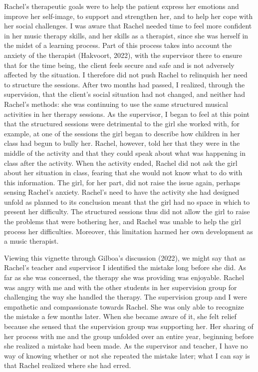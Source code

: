\documentclass[authordate, empirical, issue]{jote-new-article}
\begin{document}
Rachel's therapeutic goals were to help the patient express her emotions and improve her self-image, to support and strengthen her, and to help her cope with her social challenges. I was aware that Rachel needed time to feel more confident in her music therapy skills, and her skills as a therapist, since she was herself in the midst of a learning process. Part of this process takes into account the anxiety of the therapist (Hakvoort, 2022), with the supervisor there to ensure that for the time being, the client feels secure and safe and is not adversely affected by the situation. I therefore did not push Rachel to relinquish her need to structure the sessions. After two months had passed, I realized, through the supervision, that the client's social situation had not changed, and neither had Rachel's methods: she was continuing to use the same structured musical activities in her therapy sessions. As the supervisor, I began to feel at this point that the structured sessions were detrimental to the girl she worked with, for example, at one of the sessions the girl began to describe how children in her class had begun to bully her. Rachel, however, told her that they were in the middle of the activity and that they could speak about what was happening in class after the activity. When the activity ended, Rachel did not ask the girl about her situation in class, fearing that she would not know what to do with this information. The girl, for her part, did not raise the issue again, perhaps sensing Rachel's anxiety. Rachel's need to have the activity she had designed unfold as planned to its conclusion meant that the girl had no space in which to present her difficulty. The structured sessions thus did not allow the girl to raise the problems that were bothering her, and Rachel was unable to help the girl process her difficulties. Moreover, this limitation harmed her own development as a music therapist.







Viewing this vignette through Gilboa's discussion (2022), we might say that as Rachel's teacher and supervisor I identified the mistake long before she did. As far as she was concerned, the therapy she was providing was enjoyable. Rachel was angry with me and with the other students in her supervision group for challenging the way she handled the therapy. The supervision group and I were empathetic and compassionate towards Rachel. She was only able to recognize the mistake a few months later. When she became aware of it, she felt relief because she sensed that the supervision group was supporting her. Her sharing of her process with me and the group unfolded over an entire year, beginning before she realized a mistake had been made. As the supervisor and teacher, I have no way of knowing whether or not she repeated the mistake later; what I can say is that Rachel realized where she had erred.
\end{document}
